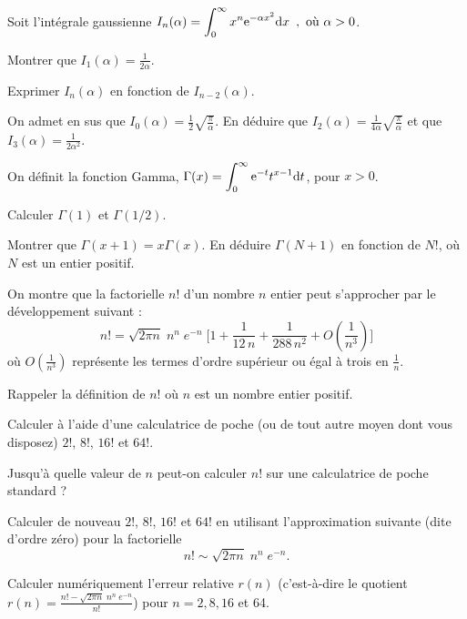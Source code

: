 
Soit l'intégrale gaussienne $ \displaystyle I_n(\alpha) = \int_{0}^{\infty} x^{n} {\rm e}^{-\alpha x^2} {\rm d}x\enspace, \textrm{ où } \alpha>0 $.

\question
Montrer que $I_1(\alpha)=\frac{1}{2\alpha}$.

\question
Exprimer $I_n(\alpha)$ en fonction de $I_{n-2}(\alpha)$.

\question
On admet en sus que $I_0(\alpha)=\frac{1}{2}\sqrt{\frac{\pi}{\alpha}}$. En déduire que $I_2(\alpha)=\frac{1}{4\alpha} \sqrt{\frac{\pi}{\alpha}}$ et que $I_3(\alpha)= \frac{1}{2\alpha^2}$.

\bigskip


On définit la fonction Gamma,  
$
\displaystyle \Gamma(x)  = \int^\infty_0 {\rm e}^{-t} t^{x-1} {\rm d}t 
$, pour $x>0$.

\question
Calculer $\Gamma(1)$ et $\Gamma (1/2)$.

\question
Montrer que $ \Gamma (x+1) = x \Gamma(x)$. En déduire $\Gamma(N+1)$ en fonction de $N!$, où $N$ est un entier positif.

\bigskip


On montre que la factorielle $n!$ d'un nombre $n$ entier peut s'approcher par le développement suivant : 
$$
\label{eqStirling}
n! = \sqrt{2 \pi n} \; n^n \; e^{-n} \; \Big[ 1 + \frac{1}{12\, n} + \frac{1}{288\, n^2}+ O(\frac{1}{n^3}) \Big]
$$
où $O(\frac{1}{n^3})$ représente les termes d'ordre supérieur ou égal à trois en $\frac{1}{n}$.

\question
Rappeler la définition de $n!$ où $n$ est un nombre entier positif.

\question
Calculer à l'aide d'une calculatrice de poche (ou de tout autre moyen dont vous disposez) $2!$, $8!$, $16!$ et $64!$.

\question
Jusqu'à quelle valeur de $n$ peut-on calculer $n!$ sur une calculatrice de poche standard ?

\question
Calculer de nouveau $2!$, $8!$, $16!$ et $64!$ en utilisant l'approximation suivante (dite d'ordre zéro) pour la factorielle
$$
n! \sim \sqrt{2 \pi n} \; n^n \; e^{-n} .
$$

\question
Calculer numériquement l'erreur relative $r(n)$ (c'est-à-dire le quotient $r(n)=\frac{n!-\sqrt{2 \pi n} \; n^n \; e^{-n}}{n!}$) pour $n=2, 8, 16$ et 64.


